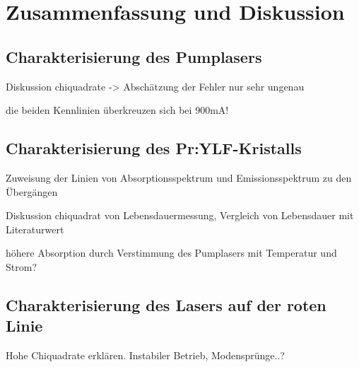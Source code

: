 \section{Zusammenfassung und Diskussion}

\subsection{Charakterisierung des Pumplasers}

Diskussion chiquadrate -> Abschätzung der Fehler nur sehr ungenau

die beiden Kennlinien überkreuzen sich bei 900mA!

\subsection{Charakterisierung des Pr:YLF-Kristalls}

Zuweisung der Linien von Absorptionsspektrum und Emissionsspektrum zu den Übergängen 

Diskussion chiquadrat von Lebensdauermessung, Vergleich von Lebensdauer mit Literaturwert

höhere Absorption durch Verstimmung des Pumplasers mit Temperatur und Strom?

\subsection{Charakterisierung des Lasers auf der roten Linie}
Hohe Chiquadrate erklären. Instabiler Betrieb, Modensprünge..?
